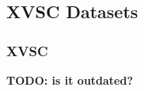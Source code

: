 \documentclass[a4paper,11pt,pdftex,twoside]{scrartcl}
\renewcommand{\bf}{\normalfont \bfseries}
\begin{document}
{{{%


\subsection{XVSC Datasets}

\subsubsection{XVSC}
\label{subsec_xvsc}

{\bf TODO: is it outdated?}
%
%


}}}
\end{document}
